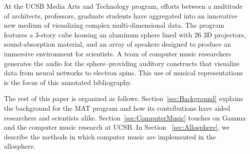 
	At the UCSB Media Arts and Technology program, efforts between a multitude of architects, professors, graduate students have aggregated into an innovative new medium of visualizing complex multi-dimensional data. The program features a 3-story cube housing an aluminum sphere lined with 26 3D projectors, sound-absorption material, and an array of speakers designed to produce an immersive environment for scientists. A team of computer music researchers generates the audio for the sphere--providing auditory constructs that visualize data from neural networks to electron spins. This use of musical representations is the focus of this annotated bibliography.

The rest of this paper is organized as follows.  Section~\ref{sec:Background} explains the background for the MAT program and how its contributions have aided researchers and scientists alike. Section~\ref{sec:ComputerMusic} touches on Gamma and the computer music research at UCSB. In Section ~\ref{sec:Allosphere}, we describe the methods in which computer music are implemented in the allosphere.

